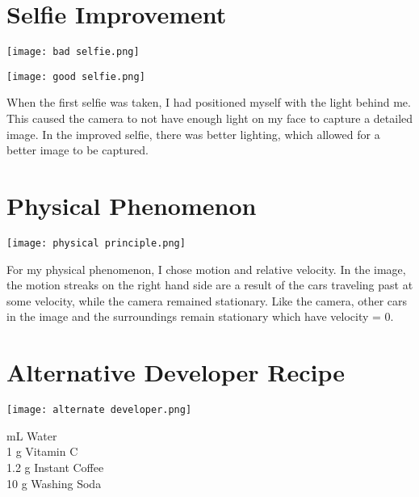 \documentclass[12pt]{article}
\begin{document}
\section*{Selfie Improvement}
    \begin{minipage}{.5\textwidth}
      \centering
      \texttt{[image: bad selfie.png]}
      \label{fig:test1}
      \vspace{5mm}
    \end{minipage}%
    \begin{minipage}{.5\textwidth}
      \centering
      \texttt{[image: good selfie.png]}
      \label{fig:test2}
      \vspace{5mm}
    \end{minipage}
    
    When the first selfie was taken, I had positioned myself with the light behind me. This caused the camera to not have enough light on my face to capture a detailed image. In the improved selfie, there was better lighting, which allowed for a better image to be captured.
\section*{Physical Phenomenon}
\begin{center}
\texttt{[image: physical principle.png]}
\end{center}
  For my physical phenomenon, I chose motion and relative velocity. In the image, the motion streaks on the right hand side are a result of the cars traveling past at some velocity, while the camera remained stationary. Like the camera, other cars in the image and the surroundings remain stationary which have velocity = 0.
\section*{Alternative Developer Recipe}
\begin{center}
    \texttt{[image: alternate developer.png]}
    \end{center}
 mL Water\\
1 g Vitamin C\\
1.2 g Instant Coffee\\
10 g Washing Soda\\
\end{document}

